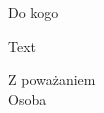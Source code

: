 \documentclass[12pt]{article}
\begin{document}
\setmainfont[Mapping=tex-text]{Libre Baskerville}


\begin{flushright}
  \Large{Do kogo}
\end{flushright}

\vspace{1cm}

Text

\vspace{1cm}

\begin{flushright}
  Z poważaniem\\
  Osoba
\end{flushright}
\end{document}
